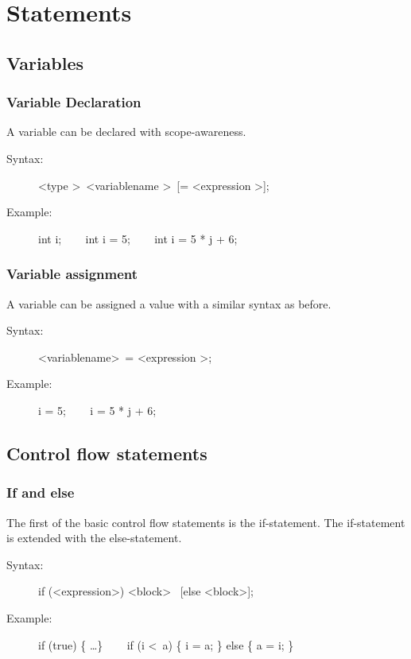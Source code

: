 \documentclass[10pt,a4paper]{report}
\begin{document}
\section{Statements}

\subsection{Variables}

\subsubsection*{Variable Declaration}
A variable can be declared with scope-awareness.
\begin{description}
	\item[Syntax:] 
		\textless type \textgreater ~\textless variablename \textgreater ~[= \textless expression \textgreater];
	\item[Example:] 
		int i; ~~~ 
		int i = 5;  ~~~ 
		int i = 5 * j + 6;
\end{description} 


\subsubsection*{Variable assignment}
A variable can be assigned a value with a similar syntax as before.
\begin{description}
	\item[Syntax:] 
		\textless variablename\textgreater ~= \textless expression \textgreater;
	\item[Example:] 
		i = 5; ~~~ 
		i = 5 * j + 6;
\end{description} 

\subsection{Control flow statements}

\subsubsection*{If and else}
The first of the basic control flow statements is the if-statement. The if-statement is extended with the else-statement.

\begin{description}
	\item[Syntax:] 
		if (\textless expression\textgreater ) \textless block\textgreater ~ [else \textless block\textgreater ];
	\item[Example:] 
		if (true) \{ \ldots \} ~~~
		if (i \textless ~a) \{ i = a; \} else \{ a = i; \}
\end{description} 
\end{document}
